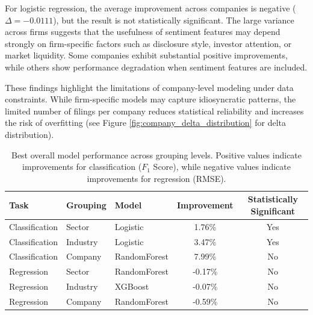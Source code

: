 For logistic regression, the average improvement across companies is negative ($\Delta = -0.0111$), but the result is not statistically significant. The large variance across firms suggests that the usefulness of sentiment features may depend strongly on firm-specific factors such as disclosure style, investor attention, or market liquidity. Some companies exhibit substantial positive improvements, while others show performance degradation when sentiment features are included.

These findings highlight the limitations of company-level modeling under data constraints. While firm-specific models may capture idiosyncratic patterns, the limited number of filings per company reduces statistical reliability and increases the risk of overfitting (see Figure \ref{fig:company_delta_distribution} for delta distribution).

\begin{table}[t]
\centering
\caption{Best overall model performance across grouping levels. Positive values indicate improvements for classification ($F_1$ Score), while negative values indicate improvements for regression (RMSE).}
\label{tab:overall_group_results}
\begin{tabular}{|l|l|l|c|c|}
\hline
Task & Grouping & Model & Improvement & Statistically Significant \\
\hline
Classification & Sector   & Logistic      & 1.76\%  & Yes \\
Classification & Industry & Logistic      & 3.47\%  & Yes \\
Classification & Company  & RandomForest  & 7.99\%  & No  \\
\hline
Regression & Sector   & RandomForest & -0.17\% & No \\
Regression & Industry & XGBoost      & -0.07\% & No \\
Regression & Company  & RandomForest & -0.59\% & No \\
\hline
\end{tabular}
\end{table}

